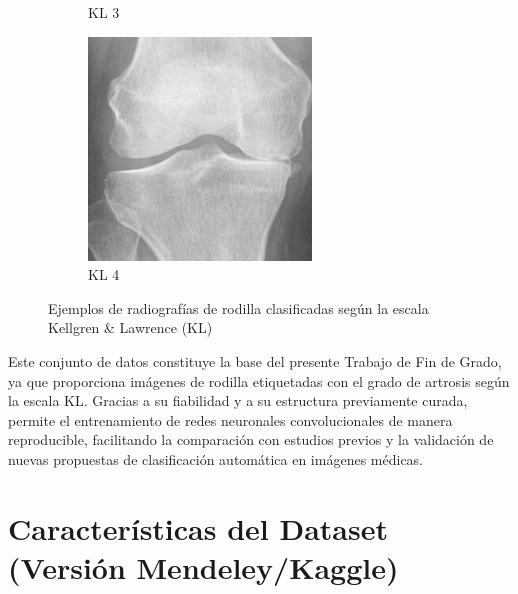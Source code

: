 \documentclass[11pt,spanish,listoffigures,listoftables]{tfgetsinf}
\begin{document}
\begin{figure}[htbp]
\begin{subfigure}[b]{0.19\textwidth}
        \caption{KL 3}
        \label{fig:knee3}
    \end{subfigure}
    \hfill
    \begin{subfigure}[b]{0.19\textwidth}
        \includegraphics[width=\textwidth]{knee_4.png}
        \caption{KL 4}
        \label{fig:knee4}
    \end{subfigure}
    \caption{Ejemplos de radiografías de rodilla clasificadas según la escala Kellgren \& Lawrence (KL)}
    \label{fig:knee-examples}
\end{figure}

Este conjunto de datos constituye la base del presente Trabajo de Fin de Grado, ya que proporciona imágenes de rodilla etiquetadas 
con el grado de artrosis según la escala KL. Gracias a su fiabilidad y a su estructura previamente curada, permite el entrenamiento
de redes neuronales convolucionales de manera reproducible, facilitando la comparación con estudios previos y la validación de nuevas 
propuestas de clasificación automática en imágenes médicas.

\section{Características del Dataset (Versión Mendeley/Kaggle)}
\label{sec:dataset_characteristics}
\end{document}
